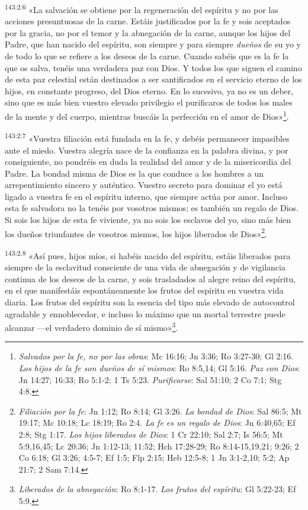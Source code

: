 \par 
\textsuperscript{143:2.6} «La salvación se obtiene por la regeneración del espíritu y no por las acciones presuntuosas de la carne. Estáis justificados por la fe y sois aceptados por la gracia, no por el temor y la abnegación de la carne, aunque los hijos del Padre, que han nacido del espíritu, son siempre y para siempre \textit{dueños} de su yo y de todo lo que se refiere a los deseos de la carne. Cuando sabéis que es la fe la que os salva, tenéis una verdadera paz con Dios. Y todos los que siguen el camino de esta paz celestial están destinados a ser santificados en el servicio eterno de los hijos, en constante progreso, del Dios eterno. En lo sucesivo, ya no es un deber, sino que es más bien vuestro elevado privilegio el purificaros de todos los males de la mente y del cuerpo, mientras buscáis la perfección en el amor de Dios»\footnote{\textit{Salvados por la fe, no por las obras}: Mc 16:16; Jn 3:36; Ro 3:27-30; Gl 2:16. \textit{Los hijos de la fe son dueños de sí mismos}: Ro 8:5,14; Gl 5:16. \textit{Paz con Dios}: Jn 14:27; 16:33; Ro 5:1-2; 1 Ts 5:23. \textit{Purificarse}: Sal 51:10; 2 Co 7:1; Stg 4:8.}.

\par 
\textsuperscript{143:2.7} «Vuestra filiación está fundada en la fe, y debéis permanecer impasibles ante el miedo. Vuestra alegría nace de la confianza en la palabra divina, y por consiguiente, no pondréis en duda la realidad del amor y de la misericordia del Padre. La bondad misma de Dios es la que conduce a los hombres a un arrepentimiento sincero y auténtico. Vuestro secreto para dominar el yo está ligado a vuestra fe en el espíritu interno, que siempre actúa por amor. Incluso esta fe salvadora no la tenéis por vosotros mismos; es también un regalo de Dios. Si sois los hijos de esta fe viviente, ya no sois los esclavos del yo, sino más bien los dueños triunfantes de vosotros mismos, los hijos liberados de Dios»\footnote{\textit{Filiación por la fe}: Jn 1:12; Ro 8:14; Gl 3:26. \textit{La bondad de Dios}: Sal 86:5; Mt 19:17; Mc 10:18; Lc 18:19; Ro 2:4. \textit{La fe es un regalo de Dios}: Jn 6:40,65; Ef 2:8; Stg 1:17. \textit{Los hijos liberados de Dios}: 1 Cr 22:10; Sal 2:7; Is 56:5; Mt 5:9,16,45; Lc 20:36; Jn 1:12-13; 11:52; Hch 17:28-29; Ro 8:14-15,19,21; 9:26; 2 Co 6:18; Gl 3:26; 4:5-7; Ef 1:5; Flp 2:15; Heb 12:5-8; 1 Jn 3:1-2,10; 5:2; Ap 21:7; 2 Sam 7:14.}.

\par 
\textsuperscript{143:2.8} «Así pues, hijos míos, si habéis nacido del espíritu, estáis liberados para siempre de la esclavitud consciente de una vida de abnegación y de vigilancia continua de los deseos de la carne, y sois trasladados al alegre reino del espíritu, en el que manifestáis espontáneamente los frutos del espíritu en vuestra vida diaria. Los frutos del espíritu son la esencia del tipo más elevado de autocontrol agradable y ennoblecedor, e incluso lo máximo que un mortal terrestre puede alcanzar ---el verdadero dominio de sí mismo»\footnote{\textit{Liberados de la abnegación}: Ro 8:1-17. \textit{Los frutos del espíritu}: Gl 5:22-23; Ef 5:9.}.

